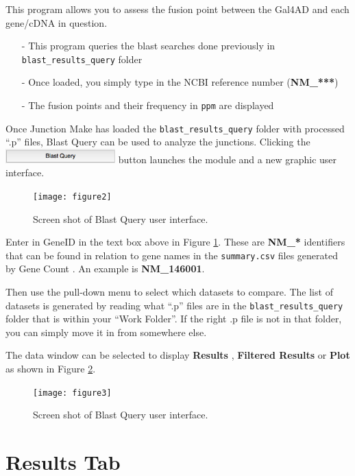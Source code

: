 \documentclass[11pt,fleqn]{book} %
\newcommand{\GeneCount}{{\color{Red} Gene Count }}
\newcommand{\JunctionMake}{{\color{Blue} Junction Make }}
\newcommand{\BlastQuery}{{\color{ForestGreen} Blast Query }}
\begin{document}
This program allows you to assess the fusion point between the Gal4AD and each gene/cDNA in question.
\begin{itemize}
    \item[-] This program queries the blast searches done previously in \texttt{blast\_results\_query} folder
    \item[-] Once loaded, you simply type in the NCBI reference number (\textbf{NM\_***})
    \item[-] The fusion points and their frequency in \texttt{ppm} are displayed
\end{itemize}


Once \JunctionMake has loaded the \texttt{blast\_results\_query} folder with processed ``.p'' files, \BlastQuery can be used to analyze the junctions. Clicking the \includegraphics[width=120pt]{Pictures/blast_query} button launches the module and a new graphic user interface.



\begin{figure}[!ht]
    \centering
    \texttt{[image: figure2]}
    \caption{Screen shot of Blast Query user interface.}
    \label{fig:blast_query_screen_shot}
\end{figure}


Enter in GeneID in the text box above in Figure \ref{fig:blast_query_screen_shot}.
These are \textbf{NM\_*} identifiers that can be found in relation to gene names in the \texttt{summary.csv} files generated by \GeneCount. An example is \textbf{NM\_146001}.

Then use the pull-down menu to select which datasets to compare. The list of datasets is generated by reading what ``.p'' files are in the \texttt{blast\_results\_query} folder that is within your ``Work Folder''.  If the right .p file is not in that folder, you can simply move it in from somewhere else.


The data window can be selected to display \textbf{Results} , \textbf{Filtered Results} or \textbf{Plot} as shown in Figure \ref{fig:blast_query_screen_shot2}.

\begin{figure}[!ht]
    \centering
    \texttt{[image: figure3]}
    \caption{Screen shot of Blast Query user interface.}
    \label{fig:blast_query_screen_shot2}
\end{figure}


\section{Results Tab}
\end{document}
